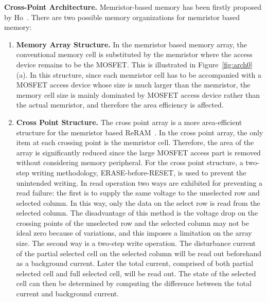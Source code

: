 \textbf{Cross-Point Architecture.}
Memristor-based memory has been firstly proposed by Ho~\cite{memristor:pengli}. There are two possible memory organizations
for memristor based memory: \begin{enumerate}
\item \noindent\textbf{Memory Array Structure.} In the memristor based
    memory array, the conventional memory cell is substituted by the
    memristor where the access device remains to be the MOSFET. This is illustrated in Figure~\ref{fig:arch0}(a). In this structure, since each memristor cell has to be accompanied with a MOSFET access device whose size is much larger than the memristor, the memory cell size is mainly dominated by MOSFET access device rather than the actual memristor, and therefore the area efficiency is affected.

  \item \noindent\textbf{Cross Point Structure.}
  The cross point array is a more area-efficient structure for the memristor based ReRAM~\cite{memristor:Cong}. In the cross point array, the only item at each crossing point is the memristor cell. Therefore, the area of the array is significantly reduced since the large MOSFET access part is removed without considering memory peripheral. For the cross point structure, a two-step writing methodology, ERASE-before-RESET, is used to prevent the unintended writing. In read operation two ways are exhibited for preventing a read failure: the first is to supply the same voltage to the unselected row and selected column. In this way, only the data on the select row is read from the selected column. The disadvantage of this method is the voltage drop on the crossing points of the unselected row and the selected column may not be ideal zero because of variations, and this imposes a limitation on the array size. The second way is a two-step write operation. The disturbance current of the partial selected cell on the selected column will be read out beforehand as a background current. Later the total current, comprised of both partial selected cell and full selected cell, will be read out. The state of the selected cell can then be determined by computing the difference between the total current and background current.

   \end{enumerate}

